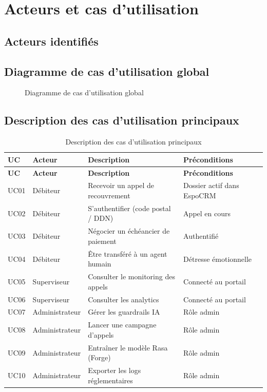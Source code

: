 \section{Acteurs et cas d'utilisation}

\subsection{Acteurs identifiés}


\subsection{Diagramme de cas d'utilisation global}

\begin{figure}[H]
  \centering
  
  \caption{Diagramme de cas d'utilisation global}
  \label{fig:usecase}
\end{figure}

\subsection{Description des cas d'utilisation principaux}

\begin{longtable}{lllp{5cm}}
  \caption{Description des cas d'utilisation principaux} \label{tab:usecase} \\
  \toprule
  \textbf{UC} & \textbf{Acteur} & \textbf{Description} & \textbf{Préconditions} \\
  \midrule
  \endfirsthead
  \toprule
  \textbf{UC} & \textbf{Acteur} & \textbf{Description} & \textbf{Préconditions} \\
  \midrule
  \endhead
  \bottomrule
  \endfoot
  UC01 & Débiteur       & Recevoir un appel de recouvrement       & Dossier actif dans EspoCRM \\
  UC02 & Débiteur       & S'authentifier (code postal / DDN)      & Appel en cours \\
  UC03 & Débiteur       & Négocier un échéancier de paiement      & Authentifié \\
  UC04 & Débiteur       & Être transféré à un agent humain        & Détresse émotionnelle \\
  UC05 & Superviseur    & Consulter le monitoring des appels      & Connecté au portail \\
  UC06 & Superviseur    & Consulter les analytics                 & Connecté au portail \\
  UC07 & Administrateur & Gérer les guardrails IA                 & Rôle admin \\
  UC08 & Administrateur & Lancer une campagne d'appels            & Rôle admin \\
  UC09 & Administrateur & Entraîner le modèle Rasa (Forge)        & Rôle admin \\
  UC10 & Administrateur & Exporter les logs réglementaires        & Rôle admin \\
\end{longtable}

